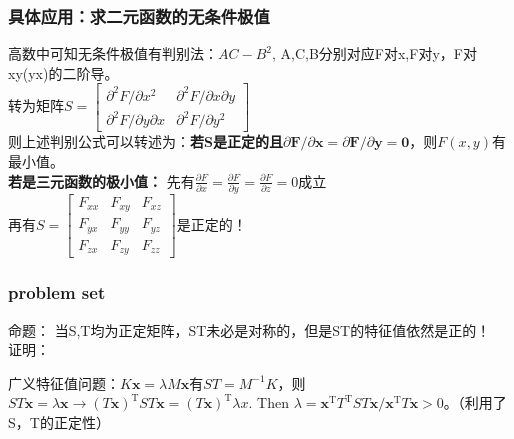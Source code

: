     \subsubsection{具体应用：求二元函数的无条件极值}
    高数中可知无条件极值有判别法：$AC-B^{2}$, A,C,B分别对应F对x,F对y，F对xy(yx)的二阶导。\\
    转为矩阵$S=\left[\begin{array}{ll}{\partial^{2} F / \partial x^{2}} & {\partial^{2} F / \partial x \partial y} \\ {\partial^{2} F / \partial y \partial x} & {\partial^{2} F / \partial y^{2}}\end{array}\right]$
    \\
    则上述判别公式可以转述为：\textbf{若S是正定的且$\partial \boldsymbol{F} / \partial \boldsymbol{x}=\partial \boldsymbol{F} / \partial \boldsymbol{y}=\mathbf{0}$}，则$F(x,y)$有最小值。
    \\
    \textbf{若是三元函数的极小值：}
    先有$\frac{\partial F}{\partial x}=\frac{\partial F}{\partial y}=\frac{\partial F}{\partial z}=0$成立\\
    再有$S=\left[\begin{array}{ccc}{F_{x x}} & {F_{x y}} & {F_{x z}} \\ {F_{y x}} & {F_{y y}} & {F_{y z}} \\ {F_{z x}} & {F_{z y}} & {F_{z z}}\end{array}\right]$是正定的！
    
    \subsubsection{problem set}
    命题： 当S,T均为正定矩阵，ST未必是对称的，但是ST的特征值依然是正的！
    \\
    证明：

    广义特征值问题：$K \boldsymbol{x}=\lambda M \boldsymbol{x}$有$S T=M^{-1} K$，则$S T \boldsymbol{x}=\lambda \boldsymbol{x} \rightarrow (T \boldsymbol{x})^{\mathrm{T}} S T \boldsymbol{x}=(T \boldsymbol{x})^{\mathrm{T}} \lambda x .$ Then $\lambda=\boldsymbol{x}^{\mathrm{T}} T^{\mathrm{T}} S T \boldsymbol{x} / \boldsymbol{x}^{\mathrm{T}} T \boldsymbol{x}>0$。（利用了S，T的正定性）

